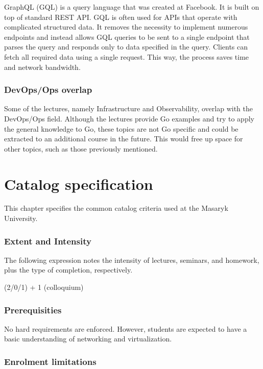 \documentclass[
  digital,
  color,
  oneside,
  nosansbold,
  nocolorbold,
  lof,
  lot,
]{fithesis4}
\begin{document}
GraphQL (GQL) is a query language that was created at Facebook. It is built on top of standard REST API. GQL is often used for APIs that operate with complicated structured data. It removes the necessity to implement numerous endpoints and instead allows GQL queries to be sent to a single endpoint that parses the query and responds only to data specified in the query. Clients can fetch all required data using a single request. This way, the process saves time and network bandwidth.

\subsubsection{DevOps/Ops overlap}

Some of the lectures, namely Infrastructure and Observability, overlap with the DevOps/Ops field. Although the lectures provide Go examples and try to apply the general knowledge to Go, these topics are not Go specific and could be extracted to an additional course in the future. This would free up space for other topics, such as those previously mentioned.

\section{Catalog specification}

This chapter specifies the common catalog criteria used at the Masaryk University.

\subsubsection{Extent and Intensity}

The following expression notes the intensity of lectures, seminars, and homework, plus the type of completion, respectively.

(2/0/1) + 1 (colloquium)

\subsubsection{Prerequisities}

No hard requirements are enforced. However, students are expected to have a basic understanding of networking and virtualization.

\subsubsection{Enrolment limitations}
\end{document}
